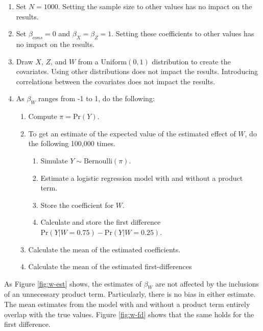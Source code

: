 \documentclass[12pt]{article}
\begin{document}
\begin{appendix}
\begin{enumerate}
\item Set $N = 1000$. Setting the sample size to other values has no impact on the results.
\item Set $\beta_{cons} = 0$ and $\beta_X = \beta_Z = 1$. Setting these coefficients to other values has no impact on the results.
\item Draw $X$, $Z$, and $W$ from a $\text{Uniform}(0, 1)$ distribution to create the covariates. Using other distributions does not impact the results. Introducing correlations between the covariates does not impact the results.
\item As $\beta_W$ ranges from -1 to 1, do the following:
	\begin{enumerate}
	\item Compute $\pi = \text{Pr}(Y)$.
	\item To get an estimate of the expected value of the estimated effect of $W$, do the following 100,000 times.
		\begin{enumerate}
		\item Simulate $Y \sim \text{Bernoulli}(\pi)$.
		\item Estimate a logistic regression model with and without a product term.
		\item Store the coefficient for $W$.
		\item Calculate and store the first difference $\text{Pr}(Y | W = 0.75) - \text{Pr}(Y | W = 0.25)$.
		
		\end{enumerate}
	\item Calculate the mean of the estimated coefficients.
	\item Calculate the mean of the estimated first-differences
	\end{enumerate}
\end{enumerate}

As Figure \ref{fig:w-est} shows, the estimates of $\beta_W$ are not affected by the inclusions of an unnecessary product term. Particularly, there is no bias in either estimate. The mean estimates from the model with and without a product term entirely overlap with the true values. Figure \ref{fig:w-fd} shows that the same holds for the first difference.


\end{appendix}
\end{document}

